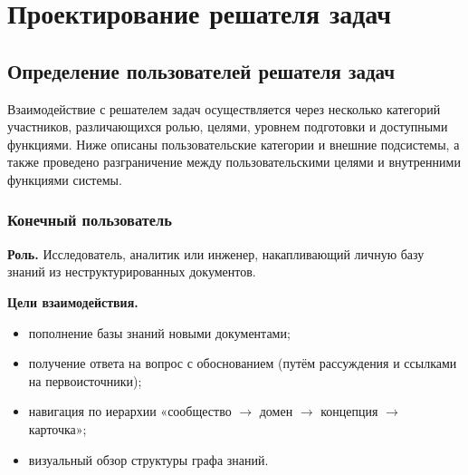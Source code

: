 \section{Проектирование решателя задач}

\subsection{Определение пользователей решателя задач}





Взаимодействие с решателем задач осуществляется через несколько категорий участников, различающихся ролью, целями, уровнем подготовки и доступными функциями. Ниже описаны пользовательские категории и внешние подсистемы, а также проведено разграничение между пользовательскими целями и внутренними функциями системы.

\subsubsection{Конечный пользователь}

\textbf{Роль.} Исследователь, аналитик или инженер, накапливающий личную базу знаний из неструктурированных документов.

\textbf{Цели взаимодействия.}
\begin{itemize}
    \item пополнение базы знаний новыми документами;
    \item получение ответа на вопрос с обоснованием (путём рассуждения и ссылками на первоисточники);
    \item навигация по иерархии «сообщество $\rightarrow$ домен $\rightarrow$ концепция $\rightarrow$ карточка»;
    \item визуальный обзор структуры графа знаний.
\end{itemize}

